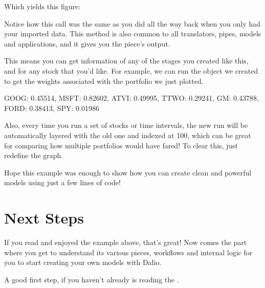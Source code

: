\documentclass[letterpaper,10pt,english]{sphinxmanual}
\begin{document}
Which yields this figure:

\noindent{}

Notice how this  call was the same as you did all the way back when you only had your imported data. This method is also common to all translators, pipes, models and applications, and it gives you the piece’s output.

This means you can get information of any of the stages you created like this, and for any stock that you’d like. For example, we can run the  object we created to get the weights associated with the portfolio we just plotted.

\begin{sphinxVerbatim}[commandchars=\\\{\}]
\end{sphinxVerbatim}

\begin{sphinxVerbatim}[commandchars=\\\{\}]
\PYGZob{}\PYGZsq{}GOOG\PYGZsq{}: 0.45514,
 \PYGZsq{}MSFT\PYGZsq{}: 0.82602,
 \PYGZsq{}ATVI\PYGZsq{}: \PYGZhy{}0.49995,
 \PYGZsq{}TTWO\PYGZsq{}: 0.29241,
 \PYGZsq{}GM\PYGZsq{}: \PYGZhy{}0.43788,
 \PYGZsq{}FORD\PYGZsq{}: 0.38413,
 \PYGZsq{}SPY\PYGZsq{}: \PYGZhy{}0.01986\PYGZcb{}
\end{sphinxVerbatim}

Also, every time you run a set of stocks or time intervals, the new run will be automatically layered with the old one and indexed at 100, which can be great for comparing how multiple portfolios would have fared! To clear this, just re\sphinxhyphen{}define the graph.

Hope this example was enough to show how you can create clean and powerful models using just a few lines of code!


\chapter{Next Steps}
\label{\detokenize{index:next-steps}}\label{\detokenize{index:id3}}
If you read and enjoyed the example above, that’s great! Now comes the part where you get to understand its various pieces, workflows and internal logic for you to start creating your own models with Dal\sphinxhyphen{}io.

A good first step, if you haven’t already is reading the {\hyperref[\detokenize{beginners-guide:beginners-guide}]{}}.
\end{document}
